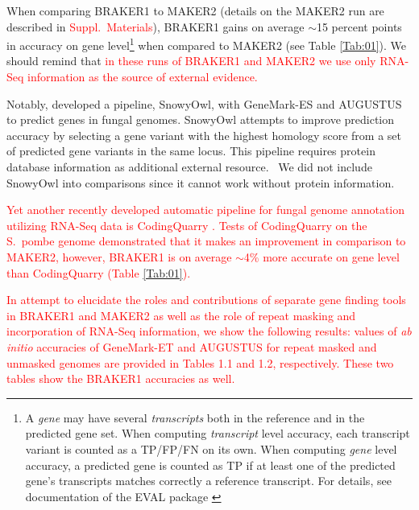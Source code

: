 \documentclass{bioinfo}
\begin{document}
When comparing BRAKER1 to MAKER2 (details on the MAKER2 run are described in \textcolor{red}{Suppl.~Materials}), BRAKER1 gains on average $\sim$15 percent points in accuracy on gene level\footnote{A \textit{gene} may have several \textit{transcripts} both in the reference and in the predicted gene set. When computing \textit{transcript} level accuracy, each transcript variant is counted as a TP/FP/FN on its own. When computing \textit{gene} level accuracy, a predicted gene is counted as TP if at least one of the predicted gene's transcripts matches correctly a reference transcript. For details, see documentation of the EVAL package \citep{Eval}} when compared to MAKER2 (see Table \ref{Tab:01}).
We should remind that \textcolor{red}{in these runs of BRAKER1 and MAKER2 we use only RNA-Seq information as the source of external evidence.}

Notably, \citet{SnowyOwl} developed a pipeline, SnowyOwl, with GeneMark-ES \citep{GeneMark-ES} and AUGUSTUS to predict genes in fungal genomes. SnowyOwl attempts to improve prediction accuracy by selecting a gene variant with the highest homology score from a set of predicted gene variants in the same locus. This pipeline requires protein database information as additional external resource.  We did not include SnowyOwl into comparisons since it cannot work without protein information.%

\textcolor{red}{Yet another recently developed automatic pipeline for fungal genome annotation utilizing RNA-Seq data is CodingQuarry \citep{CodingQuarry}. Tests of CodingQuarry on the S.~pombe genome demonstrated that it makes an improvement in comparison to MAKER2, however, BRAKER1 is on average $\sim$4\% more accurate on gene level than CodingQuarry (Table \ref{Tab:01}).}

\textcolor{red}{In attempt to elucidate the roles and contributions of separate gene finding tools in BRAKER1 and MAKER2 as well as the role of repeat masking and incorporation of RNA-Seq information, we show the following results:  values of \textit{ab initio} accuracies of GeneMark-ET and AUGUSTUS for repeat masked and unmasked genomes are provided in Tables 1.1 and 1.2, respectively. These two tables show the BRAKER1 accuracies as well.}
\end{document}
